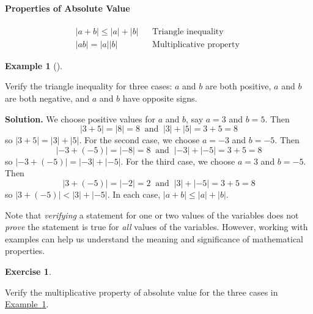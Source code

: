 \documentclass[10pt,]{book}
\theoremstyle{plain}
\theoremstyle{definition}
\newtheorem{exercise}[theorem]{Exercise}
\theoremstyle{definition}
\newtheorem{example}[theorem]{Example}
\numberwithin{equation}{section}
\newcommand\abs[1]{\left|#1\right|}
\newcommand{\lt}{ < }
\newcommand{\amp}{ & }
\begin{document}
\paragraph[Properties of Absolute Value]{Properties of Absolute Value}\label{paragraphs-25}
\begin{align}
\abs{a + b} \le \abs{a} + \abs{b} \amp\amp \text{Triangle inequality}\\
\abs{a  b} = \abs{a}  \abs{b} \amp\amp \text{Multiplicative property }
\end{align}%
\begin{example}[]\label{example-triangle-inequality}

        Verify the triangle inequality for three cases: \(a\) and \(b\) are both positive, \(a\) and \(b\) are both negative, and \(a\) and \(b\) have opposite signs.
\par\medskip\noindent%
\textbf{Solution.}\quad 
    We choose positive values for \(a\) and \(b\), say \(a = 3\) and \(b = 5\). Then 
    \begin{equation*}\abs{3 + 5} = \abs{8} = 8 ~\text{ and } ~ \abs{3}+\abs{5}= 3 + 5 = 8\end{equation*}
    so \(\abs{3 + 5} = \abs{3} + \abs{5}\). For the second case, we choose \(a = −3\) and \(b = −5\). Then
    \begin{equation*}\abs{−3 + (−5)} = \abs{−8} = 8 ~\text{ and } ~ \abs{−3}+\abs{−5} = 3 + 5 = 8\end{equation*}
    so \(\abs{−3 + (−5)} =\abs{−3}+\abs{−5}\). For the third case, we choose \(a = 3\) and \(b = −5\). Then
    \begin{equation*}\abs{3 + (−5)}=\abs{−2} = 2  ~\text{ and } ~ \abs{3}+\abs{−5}=3 + 5 = 8\end{equation*}
    so \(\abs{3 + (−5)} \lt \abs{3}+\abs{−5}\). In each case, \(\abs{a + b}\le\abs{a} +\abs{b}\).
\end{example}
\par

    Note that \emph{verifying} a statement for one or two values of the variables does not \emph{prove} the statement is true for \emph{all} values of the variables. However, working with examples can help us understand the meaning and significance of mathematical properties.
%
\begin{exercise}\label{exercise-abs-multiplicative-property}

    Verify the multiplicative property of absolute value for the three cases in \hyperref[example-triangle-inequality]{Example~\ref{example-triangle-inequality}}.
\end{exercise}
\typeout{************************************************}
\typeout{************************************************}
\end{document}
